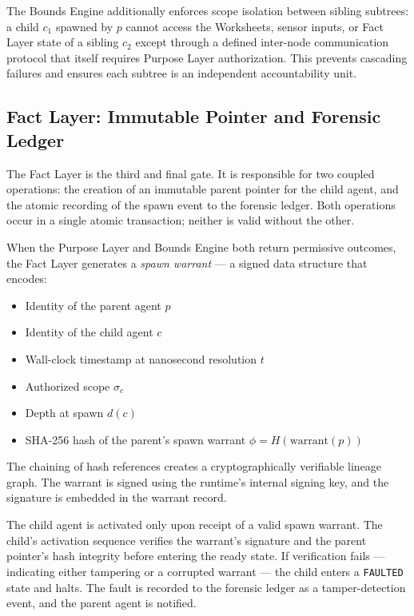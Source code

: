The Bounds Engine additionally enforces scope isolation between sibling subtrees: a child $c_1$ spawned by $p$ cannot access the Worksheets, sensor inputs, or Fact Layer state of a sibling $c_2$ except through a defined inter-node communication protocol that itself requires Purpose Layer authorization. This prevents cascading failures and ensures each subtree is an independent accountability unit.

\subsection{Fact Layer: Immutable Pointer and Forensic Ledger}
\label{sec:fact-layer}

The Fact Layer is the third and final gate. It is responsible for two coupled operations: the creation of an immutable parent pointer for the child agent, and the atomic recording of the spawn event to the forensic ledger. Both operations occur in a single atomic transaction; neither is valid without the other.

When the Purpose Layer and Bounds Engine both return permissive outcomes, the Fact Layer generates a \textit{spawn warrant} — a signed data structure that encodes:

\begin{itemize}
    \itemsep0em
    \item Identity of the parent agent $p$
    \item Identity of the child agent $c$
    \item Wall-clock timestamp at nanosecond resolution $t$
    \item Authorized scope $\sigma_c$
    \item Depth at spawn $d(c)$
    \item SHA-256 hash of the parent's spawn warrant $\phi = H(\text{warrant}(p))$
\end{itemize}

The chaining of hash references creates a cryptographically verifiable lineage graph. The warrant is signed using the runtime's internal signing key, and the signature is embedded in the warrant record.

The child agent is activated only upon receipt of a valid spawn warrant. The child's activation sequence verifies the warrant's signature and the parent pointer's hash integrity before entering the ready state. If verification fails — indicating either tampering or a corrupted warrant — the child enters a \texttt{FAULTED} state and halts. The fault is recorded to the forensic ledger as a tamper-detection event, and the parent agent is notified.

